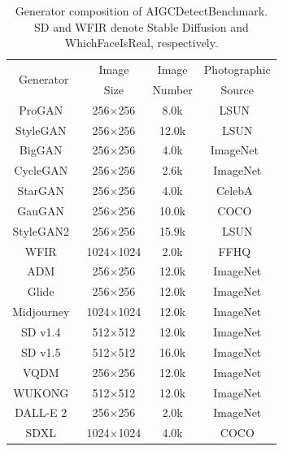 \documentclass[lettersize,journal]{IEEEtran}
\begin{document}
\begin{table}[t]
\caption{Generator composition of AIGCDetectBenchmark. SD and WFIR denote Stable Diffusion and WhichFaceIsReal, respectively.}
\label{tab:aigcdetectbenchmark}
\centering
\small
\renewcommand{\arraystretch}{1.04}
\setlength{\tabcolsep}{6pt}
\begin{tabular}{@{}cccc@{}}
\toprule
\multirow{2}{*}{Generator} & Image & Image & Photographic \\
 & Size & Number & Source \\
\midrule
ProGAN~\cite{karras2018progan} & 256$\times$256 & 8.0k & LSUN~\cite{yu2015lsun} \\
StyleGAN~\cite{karras2019stylegan} & 256$\times$256 & 12.0k & LSUN \\
BigGAN~\cite{brock2019biggan} & 256$\times$256 & 4.0k & ImageNet~\cite{deng2009imagenet} \\
CycleGAN~\cite{zhu2017cyclegan} & 256$\times$256 & 2.6k & ImageNet \\
StarGAN~\cite{choi2018stargan} & 256$\times$256 & 4.0k & CelebA~\cite{liu2015celeba} \\
GauGAN~\cite{park2019spade} & 256$\times$256 & 10.0k & COCO~\cite{lin2014coco} \\
StyleGAN2~\cite{karras2020stylegan2} & 256$\times$256 & 15.9k & LSUN \\
WFIR~\cite{whichfaceisreal2023} & 1024$\times$1024 & 2.0k & FFHQ~\cite{karras2019stylegan} \\
ADM~\cite{dhariwal2021diffusion} & 256$\times$256 & 12.0k & ImageNet \\
Glide~\cite{nichol2022glide} & 256$\times$256 & 12.0k & ImageNet \\
Midjourney~\cite{midjourney2023} & 1024$\times$1024 & 12.0k & ImageNet \\
SD v1.4~\cite{rombach2022ldm} & 512$\times$512 & 12.0k & ImageNet \\
SD v1.5~\cite{rombach2022ldm} & 512$\times$512 & 16.0k & ImageNet \\
VQDM~\cite{gu2022vqdm} & 256$\times$256 & 12.0k & ImageNet \\
WUKONG~\cite{wukong2023} & 512$\times$512 & 12.0k & ImageNet \\
DALL-E 2~\cite{ramesh2022dalle2} & 256$\times$256 & 2.0k & ImageNet \\
SDXL~\cite{podell2024sdxl} & 1024$\times$1024 & 4.0k & COCO \\
\bottomrule
\end{tabular}
\end{table}
\end{document}
